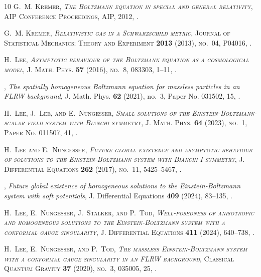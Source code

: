 \documentclass[reqno]{amsart}
\theoremstyle{definition}
\numberwithin{equation}{section}
\numberwithin{theorem}{section}
\begin{document}
\begin{thebibliography}{10}
\bgroup\scshape{}G.~M. Kremer\egroup{}, \emph{{The Boltzmann equation in special and general relativity}}, AIP Conference Proceedings, AIP, 2012, .

\bgroup\scshape{}G.~M. Kremer\egroup{}, \emph{Relativistic gas in a {S}chwarzschild metric}, Journal of Statistical Mechanics: Theory and Experiment \textbf{2013} (2013), no.~04, P04016, .

\bgroup\scshape{}H.~Lee\egroup{}, \emph{{Asymptotic behaviour of the Boltzmann equation as a cosmological model}}, J. Math. Phys. \textbf{57} (2016), no.~8, 083303, 1--11, .

\bysame, \emph{The spatially homogeneous {B}oltzmann equation for massless particles in an {FLRW} background}, J. Math. Phys. \textbf{62} (2021), no.~3, Paper No. 031502, 15, .

\bgroup\scshape{}H.~Lee\egroup{}, \bgroup\scshape{}J.~Lee\egroup{}, and \bgroup\scshape{}E.~Nungesser\egroup{}, \emph{Small solutions of the {E}instein-{B}oltzmann-scalar field system with {B}ianchi symmetry}, J. Math. Phys. \textbf{64} (2023), no.~1, Paper No. 011507, 41, .

\bgroup\scshape{}H.~Lee\egroup{} and \bgroup\scshape{}E.~Nungesser\egroup{}, \emph{Future global existence and asymptotic behaviour of solutions to the {E}instein-{B}oltzmann system with {B}ianchi {I} symmetry}, J. Differential Equations \textbf{262} (2017), no.~11, 5425--5467, .

\bysame, \emph{Future global existence of homogeneous solutions to the {E}instein-{B}oltzmann system with soft potentials}, J. Differential Equations \textbf{409} (2024), 83--135, .

\bgroup\scshape{}H.~Lee\egroup{}, \bgroup\scshape{}E.~Nungesser\egroup{}, \bgroup\scshape{}J.~Stalker\egroup{}, and \bgroup\scshape{}P.~Tod\egroup{}, \emph{Well-posedness of anisotropic and homogeneous solutions to the {E}instein-{B}oltzmann system with a conformal gauge singularity}, J. Differential Equations \textbf{411} (2024), 640--738, .

\bgroup\scshape{}H.~Lee\egroup{}, \bgroup\scshape{}E.~Nungesser\egroup{}, and \bgroup\scshape{}P.~Tod\egroup{}, \emph{The massless {E}instein-{B}oltzmann system with a conformal gauge singularity in an {FLRW} background}, Classical Quantum Gravity \textbf{37} (2020), no.~3, 035005, 25, .


\end{thebibliography}
\end{document}
